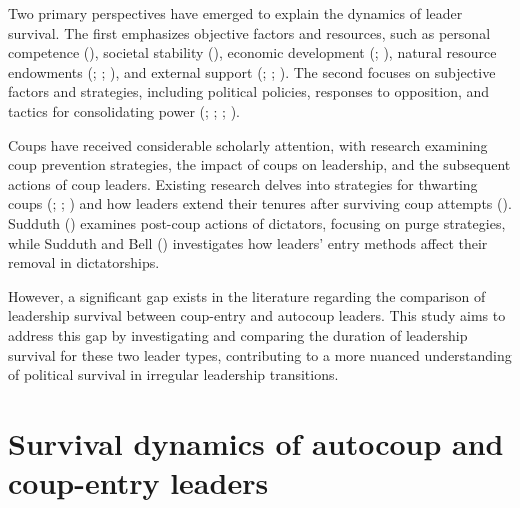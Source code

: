 \documentclass[
  12pt,
]{report}
\begin{document}
Two primary perspectives have emerged to explain the dynamics of leader
survival. The first emphasizes objective factors and resources, such as
personal competence (),
societal stability (), economic
development (;
), natural resource endowments
(;
;
), and
external support (;
; ). The second focuses on subjective factors and strategies,
including political policies, responses to opposition, and tactics for
consolidating power (; ;
;
).

Coups have received considerable scholarly attention, with research
examining coup prevention strategies, the impact of coups on leadership,
and the subsequent actions of coup leaders. Existing research delves
into strategies for thwarting coups (; ;
) and how leaders extend their
tenures after surviving coup attempts (). Sudduth () examines
post-coup actions of dictators, focusing on purge strategies, while
Sudduth and Bell () investigates how
leaders' entry methods affect their removal in dictatorships.

However, a significant gap exists in the literature regarding the
comparison of leadership survival between coup-entry and autocoup
leaders. This study aims to address this gap by investigating and
comparing the duration of leadership survival for these two leader
types, contributing to a more nuanced understanding of political
survival in irregular leadership transitions.

\section{Survival dynamics of autocoup and coup-entry
leaders}\label{survival-dynamics-of-autocoup-and-coup-entry-leaders}
\end{document}
